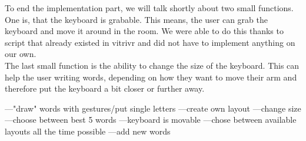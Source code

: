 To end the implementation part, we will talk shortly about two small functions. One is, that the keyboard is grabable. This means, the user can grab the keyboard and move it around in the room. We were able to do this thanks to script that already existed in vitrivr and did not have to implement anything on our own.\\
The last small function is the ability to change the size of the keyboard. This can help the user writing words, depending on how they want to move their arm and therefore put the keyboard a bit closer or further away.



---"draw" words with gestures/put single letters
---create own layout
---change size
---choose between best 5 words
---keyboard is movable
---chose between available layouts all the time possible
---add new words
